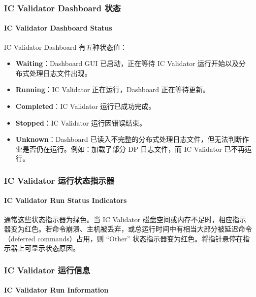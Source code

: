 
\subsubsection{IC Validator Dashboard 状态}
\paragraph*{IC Validator Dashboard Status}

IC Validator Dashboard 有五种状态值：
\begin{itemize}
  \item \textbf{Waiting}：Dashboard GUI 已启动，正在等待 IC Validator 运行开始以及分布式处理日志文件出现。
  \item \textbf{Running}：IC Validator 正在运行，Dashboard 正在等待更新。
  \item \textbf{Completed}：IC Validator 运行已成功完成。
  \item \textbf{Stopped}：IC Validator 运行因错误结束。
  \item \textbf{Unknown}：Dashboard 已读入不完整的分布式处理日志文件，但无法判断作业是否仍在运行。例如：加载了部分 DP 日志文件，而 IC Validator 已不再运行。
\end{itemize}

\subsubsection{IC Validator 运行状态指示器}
\paragraph*{IC Validator Run Status Indicators}

通常这些状态指示器为绿色。当 IC Validator 磁盘空间或内存不足时，相应指示器变为红色。若命令崩溃、主机被丢弃，或总运行时间中有相当大部分被延迟命令（deferred commands）占用，则 ``Other'' 状态指示器变为红色。将指针悬停在指示器上可显示状态原因。

\subsubsection{IC Validator 运行信息}
\paragraph*{IC Validator Run Information}

